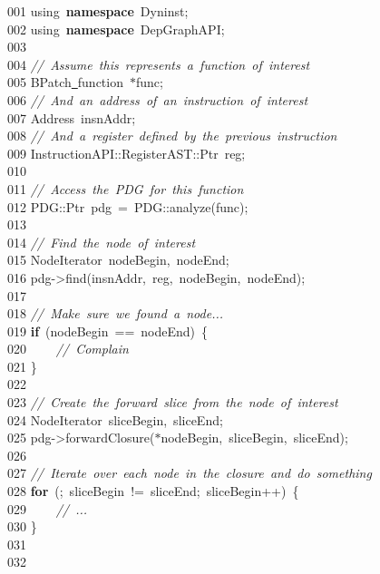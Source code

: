 {\ttfamily \raggedright \small
001 using\ \textbf{namespace}\ Dyninst;\\
002 using\ \textbf{namespace}\ DepGraphAPI;\\
003 \ \\
004 \textsl{//\ Assume\ this\ represents\ a\ function\ of\ interest}\\
005 BPatch\underline\ function\ $\ast$func;\\
006 \textsl{//\ And\ an\ address\ of\ an\ instruction\ of\ interest}\\
007 Address\ insnAddr;\\
008 \textsl{//\ And\ a\ register\ defined\ by\ the\ previous\ instruction}\\
009 InstructionAPI::RegisterAST::Ptr\ reg;\\
010 \ \\
011 \textsl{//\ Access\ the\ PDG\ for\ this\ function}\\
012 PDG::Ptr\ pdg\ =\ PDG::analyze(func);\\
013 \ \\
014 \textsl{//\ Find\ the\ node\ of\ interest}\\
015 NodeIterator\ nodeBegin,\ nodeEnd;\\
016 pdg-{}>{}find(insnAddr,\ reg,\ nodeBegin,\ nodeEnd);\\
017 \ \\
018 \textsl{//\ Make\ sure\ we\ found\ a\ node...}\\
019 \textbf{if}\ (nodeBegin\ ==\ nodeEnd)\ \{\\
020 \ \ \ \ \textsl{//\ Complain}\\
021 \}\\
022 \ \\
023 \textsl{//\ Create\ the\ forward\ slice\ from\ the\ node\ of\ interest}\\
024 NodeIterator\ sliceBegin,\ sliceEnd;\\
025 pdg-{}>{}forwardClosure($\ast$nodeBegin,\ sliceBegin,\ sliceEnd);\\
026 \ \\
027 \textsl{//\ Iterate\ over\ each\ node\ in\ the\ closure\ and\ do\ something}\\
028 \textbf{for}\ (;\ sliceBegin\ !=\ sliceEnd;\ sliceBegin++)\ \{\\
029 \ \ \ \ \textsl{//\ ...}\\
030 \}\\
031 \ \\
032  }
\normalfont\normalsize

